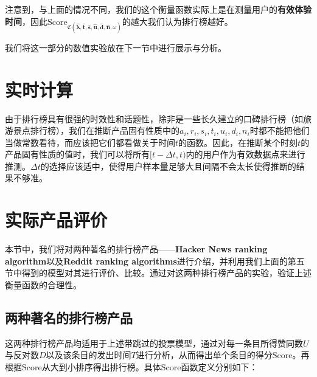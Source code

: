 \documentclass[UTF8]{ctexart}
\theoremstyle{plain}
\theoremstyle{definition}
\theoremstyle{remark}
\begin{document}
	注意到，与上面的情况不同，我们的这个衡量函数实际上是在测量用户的\textbf{有效体验时间}，因此$\mathrm{Score}_{\mathfrak{C}\left(\bm{\hat{\lambda}}, \bm{\hat{t}}, \bm{\hat{s}}, \bm{\hat{u}}, \bm{\hat{d}}, \bm{\hat{n}},\omega\right)}$的越大我们认为排行榜越好。
	
	我们将这一部分的数值实验放在下一节中进行展示与分析。
	
	\section{实时计算}
	由于排行榜具有很强的时效性和话题性，除非是一些长久建立的口碑排行榜（如旅游景点排行榜），我们在推断产品固有性质中的$a_i,r_i,s_i,t_i,u_i,d_i,n_i$时都不能把他们当做常数看待，而应该把它们都看做关于时间$t$的函数。因此，在推断某个时刻$t$的产品固有性质的值时，我们可以将所有$[t-\Delta t,t)$内的用户作为有效数据点来进行推测。$\Delta t$的选择应该适中，使得用户样本量足够大且间隔不会太长使得推断的结果不够准。
	\section{实际产品评价}
    本节中，我们将对两种著名的排行榜产品——\textbf{Hacker News ranking algorithm}以及\textbf{Reddit ranking algorithms}进行介绍，并利用我们上面的第五节中得到的模型对其进行评价、比较。通过对这两种排行榜产品的实验，验证上述衡量函数的合理性。
	\subsection{两种著名的排行榜产品}
    这两种排行榜产品均适用于上述带跳过的投票模型，通过对每一条目所得赞同数$U$与反对数$D$以及该条目的发出时间$T$进行分析，从而得出单个条目的得分$\mathrm{Score}$。再根据$\mathrm{Score}$从大到小排序得出排行榜。具体$\mathrm{Score}$函数定义分别如下：
\end{document}
